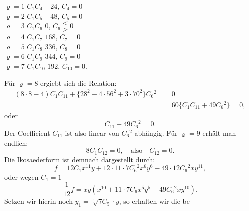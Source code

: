\begin{flushleft}
\text{\textquotedbl}\quad $\varrho=1$ \quad \text{\textquotedbl}\quad\text{\textquotedbl}\quad\quad\text{\textquotedbl}\quad\text{\textquotedbl}\quad $C_1C_4$ \quad \text{\textquotedbl}\quad\text{\textquotedbl}\quad $-24$, \quad \text{\textquotedbl}\quad $C_4=0$\\
\text{\textquotedbl}\quad $\varrho=2$ \quad \text{\textquotedbl}\quad\text{\textquotedbl}\quad\quad\text{\textquotedbl}\quad\text{\textquotedbl}\quad $C_1C_5$ \quad \text{\textquotedbl}\quad\text{\textquotedbl}\quad $-48$, \quad \text{\textquotedbl}\quad $C_5=0$\\
\text{\textquotedbl}\quad $\varrho=3$ \quad \text{\textquotedbl}\quad\text{\textquotedbl}\quad\quad\text{\textquotedbl}\quad\text{\textquotedbl}\quad $C_1C_6$ \quad \text{\textquotedbl}\quad\text{\textquotedbl}\quad $0$, \quad \text{\textquotedbl}\quad $C_6\lesseqqgtr 0$ %
\\
\text{\textquotedbl}\quad $\varrho=4$ \quad \text{\textquotedbl}\quad\text{\textquotedbl}\quad\quad\text{\textquotedbl}\quad\text{\textquotedbl}\quad $C_1C_7$ \quad \text{\textquotedbl}\quad\text{\textquotedbl}\quad $168$, \quad \text{\textquotedbl}\quad $C_7=0$\\
\text{\textquotedbl}\quad $\varrho=5$ \quad \text{\textquotedbl}\quad\text{\textquotedbl}\quad\quad\text{\textquotedbl}\quad\text{\textquotedbl}\quad $C_1C_8$ \quad \text{\textquotedbl}\quad\text{\textquotedbl}\quad $336$, \quad \text{\textquotedbl}\quad $C_8=0$\\
\text{\textquotedbl}\quad $\varrho=6$ \quad \text{\textquotedbl}\quad\text{\textquotedbl}\quad\quad\text{\textquotedbl}\quad\text{\textquotedbl}\quad $C_1C_9$ \quad \text{\textquotedbl}\quad\text{\textquotedbl}\quad $344$, \quad \text{\textquotedbl}\quad $C_9=0$\\
\text{\textquotedbl}\quad $\varrho=7$ \quad \text{\textquotedbl}\quad\text{\textquotedbl}\quad\quad\text{\textquotedbl}\quad\text{\textquotedbl}\quad $C_1C_{10}$ \quad \text{\textquotedbl}\quad\text{\textquotedbl}\quad $192$, \quad \text{\textquotedbl}\quad $C_{10}=0$.
\end{flushleft}

Für $\varrho=8$ ergiebt sich die Relation:
\[
\begin{aligned}
(8\cdot8-4)C_1C_{11}+\{28^2-4\cdot56^2+3\cdot70^2\}C_6{}^2&=0\\
&=60\{C_1C_{11}+49C_6{}^2\}=0,
\end{aligned}
\]
oder
\[
C_{11}+49C_6{}^2=0.
\]
Der Coefficient $C_{11}$ ist also linear von $C_6{}^2$ abhängig. Für $\varrho=9$
erhält man endlich:
\[
8C_1C_{12}=0,\quad\text{also}\quad C_{12}=0.
\]
Die Ikosaederform ist demnach dargestellt durch:
\[
f=12C_1x^{11}y+12\cdot11\cdot7C_6{}^2x^6y^6-49\cdot12C_6{}^2xy^{11},
\]
oder wegen $C_1=1$
\[
\frac{1}{12}f=xy(x^{10}+11\cdot7C_6x^5y^5-49C_6{}^2xy^{10}).
\]
Setzen wir hierin noch $y_1=\sqrt[5]{7C_5}\cdot y$, so erhalten wir die be-


